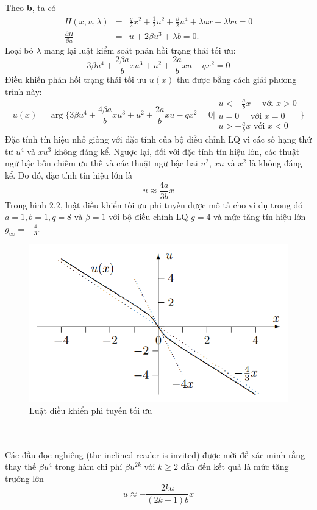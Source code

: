 \documentclass[12pt,a4paper]{report}
\begin{document}
Theo \textbf{b}, ta có 
\begin{eqnarray}
	H(x, u, \lambda) &=& \frac{q}{2}x^2 + \frac{1}{2}u^2 + \frac{\beta}{2}u^4 + \lambda ax + \lambda bu = 0 \nonumber \\ \frac{\partial H}{\partial u} &=& u + 2\beta u^3 + \lambda b = 0. \nonumber
\end{eqnarray} Loại bỏ $\lambda$ mang lại luật kiểm soát phản hồi trạng thái tối ưu: $$3\beta u^4 + \frac{2\beta a}{b}xu^3 + u^2 + \frac{2a}{b}xu - qx^2 = 0$$ Điều khiển phản hồi trạng thái tối ưu $u(x)$ thu được bằng cách giải phương trình này: $$u(x) = \arg \Bigg\{3\beta u^4 + \frac{4\beta a}{b}xu^3 + u^2 + \frac{2a}{b}xu - qx^2 = 0 \Bigg| \begin{matrix}
u<-\frac{a}{b}x \quad \text{ với } x > 0\\ u = 0 \quad \text{ với } x = 0 \\ u > -\frac{a}{b}x \text{ với } x < 0
\end{matrix}\Bigg\}$$ Đặc tính tín hiệu nhỏ giống với đặc tính của bộ điều chỉnh LQ vì các số hạng thứ tư $u^4$ và $xu^3$ không đáng kể. Ngược lại, đối với đặc tính tín hiệu lớn, các thuật ngữ bậc bốn chiếm ưu thế và các thuật ngữ bậc hai $u^2$, $xu$ và $x^2$ là không đáng kể. Do đó, đặc tính tín hiệu lớn là $$u \approx \frac{4a}{3b}x$$ Trong hình 2.2, luật điều khiển tối ưu phi tuyến được mô tả cho ví dụ trong đó $a = 1, b = 1, q = 8$ và $\beta = 1$ với bộ điều chỉnh LQ $g = 4$ và mức tăng tín hiệu lớn $g_{\infty} = - \frac{4}{3}$.
\begin{figure}[h]
	\centering
	\includegraphics[scale=.8]{hinh2ct.png}
	\caption{Luật điều khiển phi tuyến tối ưu}
\end{figure}\\\\
Các đầu đọc nghiêng (the inclined reader is invited) được mời để xác minh rằng thay thế $\beta u^4$ trong hàm chi phí $\beta u^{2k}$ với $k \geq 2$ dẫn đến kết quả là mức tăng trưởng lớn $$u\approx -\frac{2ka}{(2k-1)b}x$$
\end{document}
